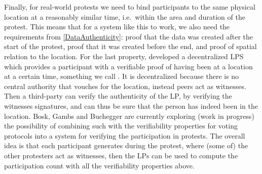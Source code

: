 Finally, for real-world protests we need to bind participants to the same 
physical location at a reasonably similar time, i.e.\ within the area and 
duration of the protest.
This means that for a system like this to work, we also need the requirements 
from \cref{DataAuthenticity}: proof that the data was created after the start 
of the protest, proof that it was created before the end, and proof of spatial 
relation to the location.
For the last property, \citet{PROPS} developed a decentralized \ac{LPS} which 
provides a participant with a verifiable proof of having been at a location at 
a certain time, something we call .
It is decentralized because there is no central authority that vouches for the 
location, instead peers act as witnesses.
Then a third-party can verify the authenticity of the \ac{LP}, by verifying the 
witnesses signatures, and can thus be sure that the person has indeed been in 
the location.
Bosk, Gambs and Buchegger are currently exploring (work in progress) the 
possibility of combining such  with the verifiability properties for 
voting protocols into a system for verifying the participation in protests.
The overall idea is that each participant generates  during the 
protest, where (some of) the other protesters act as witnesses, then the 
\acp{LP} can be used to compute the participation count with all the 
verifiability properties above.


